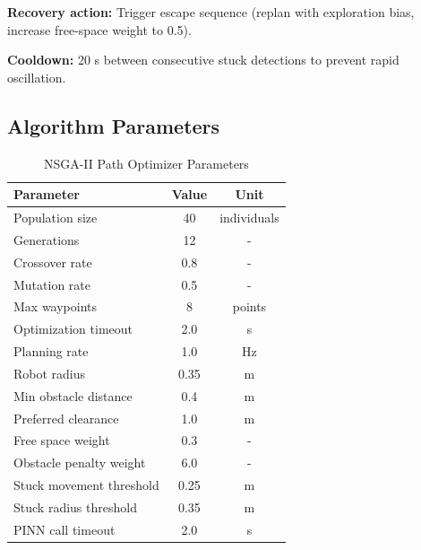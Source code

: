 \textbf{Recovery action:} Trigger escape sequence (replan with exploration bias, increase free-space weight to 0.5).

\textbf{Cooldown:} 20 s between consecutive stuck detections to prevent rapid oscillation.

\subsection{Algorithm Parameters}

\begin{table}[h]
\centering
\caption{NSGA-II Path Optimizer Parameters}
\label{tab:nsga_params}
\begin{tabular}{lcc}
\toprule
\textbf{Parameter} & \textbf{Value} & \textbf{Unit} \\
\midrule
Population size & 40 & individuals \\
Generations & 12 & - \\
Crossover rate & 0.8 & - \\
Mutation rate & 0.5 & - \\
Max waypoints & 8 & points \\
Optimization timeout & 2.0 & s \\
Planning rate & 1.0 & Hz \\
Robot radius & 0.35 & m \\
Min obstacle distance & 0.4 & m \\
Preferred clearance & 1.0 & m \\
Free space weight & 0.3 & - \\
Obstacle penalty weight & 6.0 & - \\
Stuck movement threshold & 0.25 & m \\
Stuck radius threshold & 0.35 & m \\
PINN call timeout & 2.0 & s \\
\bottomrule
\end{tabular}
\end{table}




